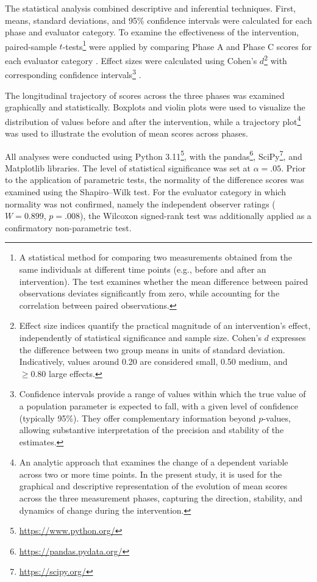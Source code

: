 \documentclass[journal]{IEEEtran}
\begin{document}
The statistical analysis combined descriptive and inferential techniques. First, means, standard deviations, and 95\% confidence intervals were calculated for each phase and evaluator category. To examine the effectiveness of the intervention, paired-sample $t$-tests\footnote{A statistical method for comparing two measurements obtained from the same individuals at different time points (e.g., before and after an intervention). The test examines whether the mean difference between paired observations deviates significantly from zero, while accounting for the correlation between paired observations.} were applied by comparing Phase A and Phase C scores for each evaluator category \cite{student1908}. Effect sizes were calculated using Cohen's $d$\footnote{Effect size indices quantify the practical magnitude of an intervention's effect, independently of statistical significance and sample size. Cohen's $d$ expresses the difference between two group means in units of standard deviation. Indicatively, values around 0.20 are considered small, 0.50 medium, and $\geq 0.80$ large effects.} with corresponding confidence intervals\footnote{Confidence intervals provide a range of values within which the true value of a population parameter is expected to fall, with a given level of confidence (typically 95\%). They offer complementary information beyond $p$-values, allowing substantive interpretation of the precision and stability of the estimates.} \cite{cohen1988}.

The longitudinal trajectory of scores across the three phases was examined graphically and statistically. Boxplots and violin plots were used to visualize the distribution of values before and after the intervention, while a trajectory plot\footnote{An analytic approach that examines the change of a dependent variable across two or more time points. In the present study, it is used for the graphical and descriptive representation of the evolution of mean scores across the three measurement phases, capturing the direction, stability, and dynamics of change during the intervention.} was used to illustrate the evolution of mean scores across phases.

All analyses were conducted using Python 3.11\footnote{\url{https://www.python.org/}}, with the pandas\footnote{\url{https://pandas.pydata.org/}}, SciPy\footnote{\url{https://scipy.org/}}, and Matplotlib libraries. The level of statistical significance was set at $\alpha=.05$. Prior to the application of parametric tests, the normality of the difference scores was examined using the Shapiro--Wilk test. For the evaluator category in which normality was not confirmed, namely the independent observer ratings ($W=0.899$, $p=.008$), the Wilcoxon signed-rank test was additionally applied as a confirmatory non-parametric test.
\end{document}
